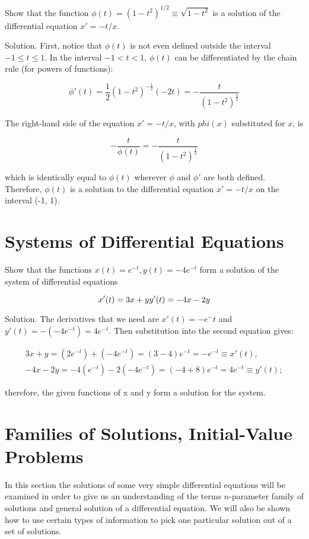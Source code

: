     \begin{problem}
      Show that the function $\phi(t)=(1-t^2)^{1/2}\equiv\sqrt{1-t^2}$ is a solution of the differential equation $x'=-t/x$.

      Solution. First, notice that $\phi(t)$ is not even defined outside the interval $-1\le t\le 1$. In the interval $-1<t<1$, $\phi(t)$ can be differentiated by the chain rule (for powers of functions):

      \[
        \phi'(t) =\frac{1}{2}(1 - t^2)^{ - \frac{1}{2}}( - 2t) =- \frac{t}{(1 - t^2)^{\frac{1}{2}}}
      \]

      The right-hand side of the equation $x'=-t/x$, with $phi(x)$ substituted for $x$, is 

      \[
        - \frac{t}{\phi (t)} =- \frac{t}{(1 - t^2)^{\frac{1}{2}}}
      \]

      which is identically equal to $\phi(t)$ wherever $\phi$ and $\phi'$ are both defined. Therefore, $\phi(t)$ is a solution to the differential equation $x'=-t/x$ on the interval (-1, 1).
    \end{problem}

\section{Systems of Differential Equations}

  \begin{problem}
    Show that the functions $x(t)=e^{-t},y(t)=-4e^{-t}$ form a solution of the system of differential equations

    \[
      x'(t) = 3x + y\newline
      y'(t) =- 4x - 2y
    \]

    Solution. The derivatives that we need are $x'(t)=-e^-t$ and $y'(t)=-(-4e^{-t})=4e^{-t}$. Then substitution into the second equation gives:

    \begin{align*}
      3x+y=(2e^{-t})+(-4e^{-t})=(3-4)e^{-t}=-e^{-t}\equiv x'(t),\\
      -4x-2y=-4(e^{-t})-2(-4e^{-t})=(-4+8)e^{-t}=4e^{-t}\equiv y'(t);
    \end{align*}

    therefore, the given functions of x and y form a solution for the system.
  \end{problem}

\section{Families of Solutions, Initial-Value Problems}
  In this section the solutions of some very simple differential equations will be examined in order to give us an understanding of the terms $n$-parameter family of solutions and general solution of a differential equation. We will also be shown how to use certain types of information to pick one particular solution out of a set of solutions.

